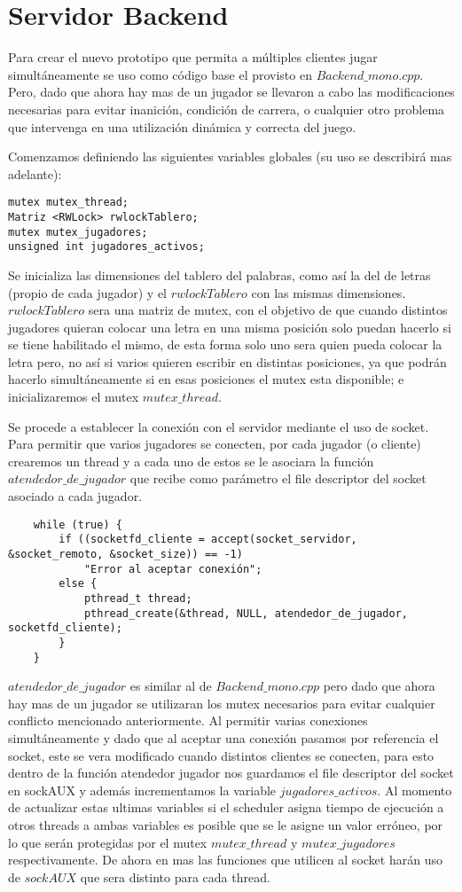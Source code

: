 \section{Servidor Backend}
Para crear el nuevo prototipo que permita a múltiples clientes jugar simultáneamente se uso como  código base el provisto en $Backend\_mono.cpp$. Pero, dado que ahora hay mas de un jugador se llevaron a cabo las modificaciones necesarias para evitar inanición, condición de carrera, o cualquier otro problema que intervenga en una utilización dinámica y correcta del juego.

Comenzamos definiendo las siguientes variables globales (su uso se describirá mas adelante):
\begin{verbatim}
mutex mutex_thread;
Matriz <RWLock> rwlockTablero;
mutex mutex_jugadores;
unsigned int jugadores_activos;
\end{verbatim}

Se inicializa las dimensiones del tablero del palabras, como así la del de letras (propio de cada  jugador) y el $rwlockTablero$ con las mismas dimensiones. $rwlockTablero$ sera una matriz de mutex, con el objetivo de que cuando distintos jugadores quieran  colocar una letra en una misma posición solo puedan hacerlo si se tiene habilitado el mismo, de esta forma solo uno sera quien pueda colocar la letra pero, no así si varios quieren escribir en distintas posiciones, ya que podrán hacerlo simultáneamente si en esas posiciones el mutex esta disponible; e inicializaremos el mutex $mutex\_thread$.

Se procede a establecer la conexión con el servidor mediante el uso de socket. Para permitir que varios jugadores se conecten, por cada jugador (o cliente) crearemos un thread y a cada uno de estos se le asociara la función $atendedor\_de\_jugador$ que recibe como parámetro el file descriptor del socket asociado a cada jugador. 
\begin{verbatim}
    while (true) {
        if ((socketfd_cliente = accept(socket_servidor, &socket_remoto, &socket_size)) == -1)
            "Error al aceptar conexión";
        else {
            pthread_t thread;
            pthread_create(&thread, NULL, atendedor_de_jugador, socketfd_cliente);
        }
    }
\end{verbatim}
$atendedor\_de\_jugador$ es similar al de $Backend\_mono.cpp$ pero dado que ahora hay mas de un jugador se utilizaran los mutex necesarios para evitar cualquier conflicto mencionado anteriormente.
Al permitir varias conexiones simultáneamente y dado que al aceptar una conexión pasamos por referencia el socket, este se vera modificado cuando distintos clientes se conecten, para esto dentro de la función atendedor jugador nos guardamos el file descriptor del socket en sockAUX y además incrementamos la variable $jugadores\_activos$. Al momento de actualizar estas ultimas variables si el scheduler asigna tiempo de ejecución a otros threads a ambas variables es posible que se le asigne un valor erróneo, por lo que serán protegidas por el mutex $mutex\_thread$ y $mutex\_jugadores$ respectivamente. 
De ahora en mas las funciones que utilicen al socket harán uso de $sockAUX$ que sera distinto para cada thread.


